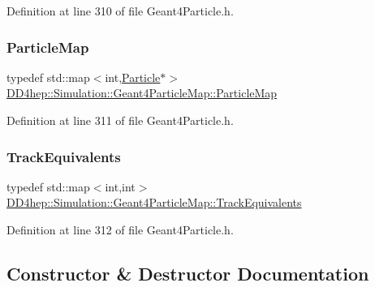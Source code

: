 Definition at line 310 of file Geant4\+Particle.\+h.

\hypertarget{class_d_d4hep_1_1_simulation_1_1_geant4_particle_map_a065c5fb0629285022b9aa2a628bffef3}{}\label{class_d_d4hep_1_1_simulation_1_1_geant4_particle_map_a065c5fb0629285022b9aa2a628bffef3} 
\subsubsection{\texorpdfstring{Particle\+Map}{ParticleMap}}
{\footnotesize\ttfamily typedef std\+::map$<$int,\hyperlink{class_d_d4hep_1_1_simulation_1_1_geant4_particle_map_a01ed68f2fc2e55ecf936e5ac3e6eae5f}{Particle}$\ast$$>$ \hyperlink{class_d_d4hep_1_1_simulation_1_1_geant4_particle_map_a065c5fb0629285022b9aa2a628bffef3}{D\+D4hep\+::\+Simulation\+::\+Geant4\+Particle\+Map\+::\+Particle\+Map}}



Definition at line 311 of file Geant4\+Particle.\+h.

\hypertarget{class_d_d4hep_1_1_simulation_1_1_geant4_particle_map_aba09f5fcb2dd5874d129660ad4454a21}{}\label{class_d_d4hep_1_1_simulation_1_1_geant4_particle_map_aba09f5fcb2dd5874d129660ad4454a21} 
\subsubsection{\texorpdfstring{Track\+Equivalents}{TrackEquivalents}}
{\footnotesize\ttfamily typedef std\+::map$<$int,int$>$ \hyperlink{class_d_d4hep_1_1_simulation_1_1_geant4_particle_map_aba09f5fcb2dd5874d129660ad4454a21}{D\+D4hep\+::\+Simulation\+::\+Geant4\+Particle\+Map\+::\+Track\+Equivalents}}



Definition at line 312 of file Geant4\+Particle.\+h.



\subsection{Constructor \& Destructor Documentation}
\hypertarget{class_d_d4hep_1_1_simulation_1_1_geant4_particle_map_aeada79751afc2787bc020aff0e413504}{}\label{class_d_d4hep_1_1_simulation_1_1_geant4_particle_map_aeada79751afc2787bc020aff0e413504} 

